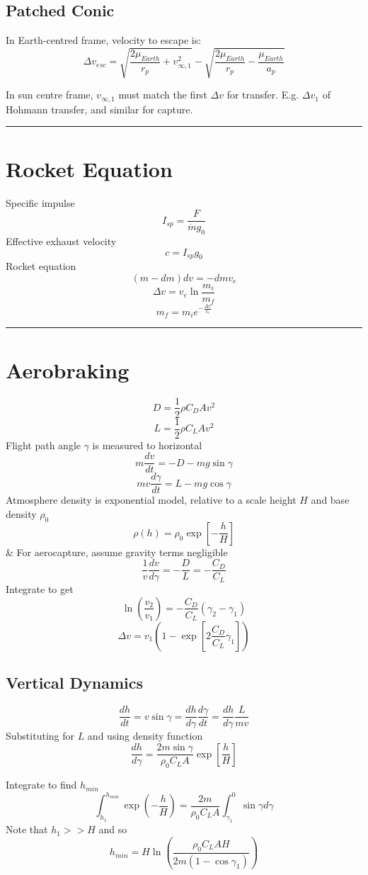 \documentclass[table,cmyk,fleqn]{article}
\begin{document}
\begin{longtable}
\subsection*{Patched Conic}
In Earth-centred frame, velocity to escape is:
\[\Delta v_{esc} = \sqrt{\frac{2\mu_{Earth}}{r_p}+v_{\infty,1}^2}-\sqrt{\frac{2\mu_{Earth}}{r_p}-\frac{\mu_{Earth}}{a_p}}\]

In sun centre frame, $v_{\infty,1}$ must match the first $\Delta v$ for transfer. E.g. $\Delta v_1$ of Hohmann transfer, and similar for capture.
\noindent\rule{9cm}{0.4pt}
\section*{Rocket Equation}
Specific impulse
\[I_{sp} = \frac{F}{\dot{m}g_0}\]
Effective exhaust velocity
\[c=I_{sp}g_0\]
Rocket equation
\[(m-dm)dv = -dmv_e\]
\[\Delta v = v_e \ln \frac{m_i}{m_f}\]
\[m_f = m_i e^{-\frac{\Delta v}{v_e}}\]
\noindent\rule{9cm}{0.4pt}
\section*{Aerobraking}
\[D = \frac{1}{2}\rho C_D A v^2\]
\[L = \frac{1}{2}\rho C_L Av^2\]
Flight path angle $\gamma$ is measured to horizontal
\[m\frac{dv}{dt} = -D-mg\sin \gamma\]
\[mv\frac{d\gamma}{dt} = L - mg\cos \gamma\]
Atmosphere density is exponential model, relative to a scale height $H$ and base density $\rho_0$
\[\rho(h) = \rho_0\exp \left[-\frac{h}{H}\right]\]
&
For aerocapture, assume gravity terms negligible
\[\frac{1}{v}\frac{dv}{d\gamma} = -\frac{D}{L} = -\frac{C_D}{C_L}\]
Integrate to get
\[\ln \left(\frac{v_2}{v_1}\right) = -\frac{C_D}{C_L}(\gamma_2-\gamma_1)\]
\[\Delta v = v_1\left( 1-\exp\left[ 2\frac{C_D}{C_L}\gamma_1\right]\right)\]

\subsection*{Vertical Dynamics}
\[\frac{dh}{dt} = v\sin \gamma = \frac{dh}{d\gamma}\frac{d\gamma}{dt} = \frac{dh}{d\gamma}\frac{L}{mv}\]
Substituting for $L$ and using density function
\[\frac{dh}{d\gamma} = \frac{2m\sin \gamma}{\rho_0 C_L A} \exp\left[\frac{h}{H}\right]\]

Integrate to find $h_{min}$
\[\int_{h_1}^{h_{min}}\exp \left( -\frac{h}{H}\right) = \frac{2m}{\rho_0 C_L A}\int_{\gamma_1}^{0}\sin \gamma d \gamma\]
Note that $h_1 >> H$ and so
\[h_{min} = H\ln \left( \frac{\rho_0C_LAH}{2m(1-\cos \gamma_1)}\right)\]


\end{longtable}
\end{document}

